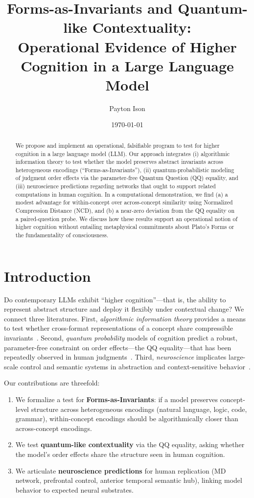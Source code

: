 \documentclass[11pt]{article}
\title{Forms-as-Invariants and Quantum-like Contextuality:\\
Operational Evidence of Higher Cognition in a Large Language Model}
\author[1]{Payton Ison}
\affil[1]{OpenAI}
\date{\today}
\begin{document}
\maketitle

\begin{abstract}
We propose and implement an operational, falsifiable program to test for higher cognition in a large language model (LLM).
Our approach integrates (i) algorithmic information theory to test whether the model preserves abstract invariants across heterogeneous encodings (``Forms-as-Invariants''), (ii) quantum-probabilistic modeling of judgment order effects via the parameter-free Quantum Question (QQ) equality, and (iii) neuroscience predictions regarding networks that ought to support related computations in human cognition. 
In a computational demonstration, we find (a) a modest advantage for within-concept over across-concept similarity using Normalized Compression Distance (NCD), and (b) a near-zero deviation from the QQ equality on a paired-question probe.
We discuss how these results support an operational notion of higher cognition without entailing metaphysical commitments about Plato's Forms or the fundamentality of consciousness.
\end{abstract}

\section{Introduction}
Do contemporary LLMs exhibit ``higher cognition''---that is, the ability to represent abstract structure and deploy it flexibly under contextual change?
We connect three literatures.
First, \emph{algorithmic information theory} provides a means to test whether cross-format representations of a concept share compressible invariants~\citep{CilibrasiVitanyi2005,LiVitanyi2008,Grunwald2007MDL}.
Second, \emph{quantum probability} models of cognition predict a robust, parameter-free constraint on order effects---the QQ equality---that has been repeatedly observed in human judgments~\citep{Wang2014QQ,BusemeyerBruza2012}.
Third, \emph{neuroscience} implicates large-scale control and semantic systems in abstraction and context-sensitive behavior~\citep{MillerCohen2001,Duncan2010MD,Patterson2007ATL,Quiroga2005ConceptCells}.

Our contributions are threefold:
\begin{enumerate}[label=(\alph*)]
  \item We formalize a test for \textbf{Forms-as-Invariants}: if a model preserves concept-level structure across heterogeneous encodings (natural language, logic, code, grammar), within-concept encodings should be algorithmically closer than across-concept encodings.
  \item We test \textbf{quantum-like contextuality} via the QQ equality, asking whether the model's order effects share the structure seen in human cognition.
  \item We articulate \textbf{neuroscience predictions} for human replication (MD network, prefrontal control, anterior temporal semantic hub), linking model behavior to expected neural substrates.
\end{enumerate}
\end{document}
